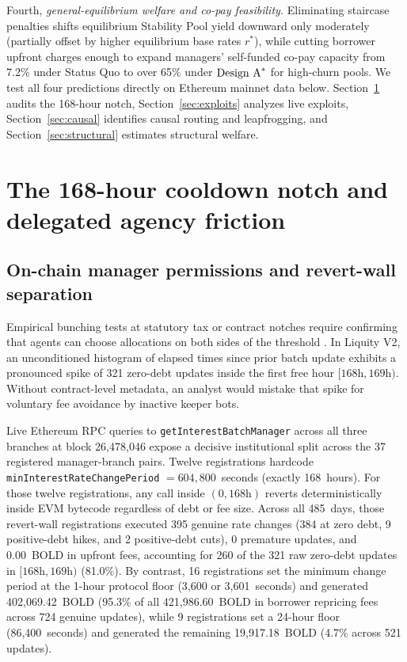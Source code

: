 Fourth, \emph{general-equilibrium welfare and co-pay feasibility.} Eliminating staircase penalties shifts equilibrium Stability Pool yield downward only moderately (partially offset by higher equilibrium base rates $r^*$), while cutting borrower upfront charges enough to expand managers' self-funded co-pay capacity from 7.2\% under Status Quo to over 65\% under $\text{Design A}^*$ for high-churn pools. We test all four predictions directly on Ethereum mainnet data below. Section~\ref{sec:notch} audits the 168-hour notch, Section~\ref{sec:exploits} analyzes live exploits, Section~\ref{sec:causal} identifies causal routing and leapfrogging, and Section~\ref{sec:structural} estimates structural welfare.

\section{The 168-hour cooldown notch and delegated agency friction}\label{sec:notch}

\subsection{On-chain manager permissions and revert-wall separation}\label{subsec:permissions}

Empirical bunching tests at statutory tax or contract notches require confirming that agents can choose allocations on both sides of the threshold \citep{kleven2013using}. In Liquity V2, an unconditioned histogram of elapsed times since prior batch update exhibits a pronounced spike of 321 zero-debt updates inside the first free hour $[168\text{h}, 169\text{h})$. Without contract-level metadata, an analyst would mistake that spike for voluntary fee avoidance by inactive keeper bots.

Live Ethereum RPC queries to \texttt{getInterestBatchManager} across all three branches at block 26,478,046 expose a decisive institutional split across the 37 registered manager-branch pairs. Twelve registrations hardcode \texttt{minInterestRateChangePeriod} $= 604{,}800$~seconds (exactly 168~hours). For those twelve registrations, any call inside $(0, 168\text{h})$ reverts deterministically inside EVM bytecode regardless of debt or fee size. Across all 485~days, those revert-wall registrations executed 395 genuine rate changes (384 at zero debt, 9 positive-debt hikes, and 2 positive-debt cuts), 0 premature updates, and 0.00~BOLD in upfront fees, accounting for 260 of the 321 raw zero-debt updates in $[168\text{h}, 169\text{h})$ (81.0\%). By contrast, 16 registrations set the minimum change period at the 1-hour protocol floor (3,600 or 3,601~seconds) and generated 402,069.42~BOLD (95.3\% of all 421,986.60~BOLD in borrower repricing fees across 724 genuine updates), while 9 registrations set a 24-hour floor (86,400~seconds) and generated the remaining 19,917.18~BOLD (4.7\% across 521 updates).

